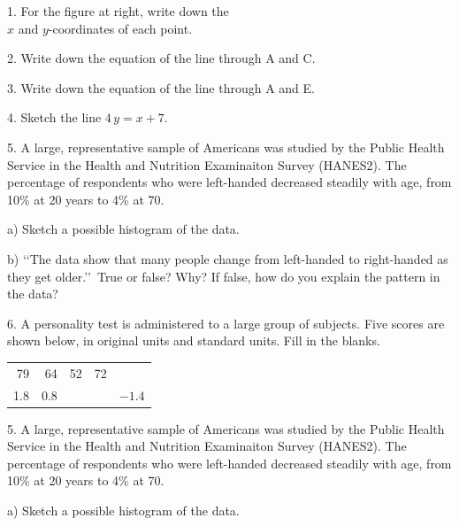 \documentclass[10pt]{article}
\begin{document}
{1. For the figure at right, write down the\\ $x$ and 
$y$-coordinates of each point.
\vspace{0.5in}

2. Write down the equation of the line through  A and C.
\vspace{1in}

3. Write down the equation of the line through  A and E.
\vspace{1in}

4. Sketch the line $4\,y=x + 7$.}

\eject

5.  A large, representative sample of Americans was studied by the Public Health 
Service in the Health and Nutrition Examinaiton Survey (HANES2).  The
percentage of respondents who were left-handed decreased
steadily with age,
from 10\% at 20 years to 4\% at 70.  

\hspace{10pt} a) Sketch a possible histogram of the data.
\vspace{1in}


\hspace{10pt} b) \lq\lq The data show that many people change from left-handed to 
right-handed as they get older.\rq\rq\ True or false?  Why?  If false, how do you 
explain the pattern in the data?
\vspace{.5in}

6.  A personality test is administered to a large group of subjects.  
Five scores are shown below, in original units and standard units.  Fill in the blanks.\vspace{-5pt}
\newcommand{\bl}{\underbar{\hspace{20pt}}}
\begin{center}
{\setlength{\tabcolsep}{20pt}\begin{tabular}{rrrrr}
79 & 64 & 52 & 72 & \bl\\[15pt]
1.8 & 0.8 & \bl & \bl & $-1.4$
\end{tabular}}
\end{center}
\vfill

5.  A large, representative sample of Americans was studied by the Public Health 
Service in the Health and Nutrition Examinaiton Survey (HANES2).  The
percentage of respondents who were left-handed decreased
steadily with age,
from 10\% at 20 years to 4\% at 70.  

\hspace{10pt} a) Sketch a possible histogram of the data.
\vspace{1in}
\end{document}
